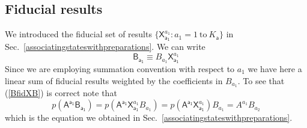 \documentclass[10pt]{article}
\begin{document}
\subsection{Fiducial results}

We introduced the  fiducial set of results $\{ \mathsf{X}_\mathsf{a_1}^{a_1} : a_1=1 ~\text{to}~ K_\mathsf{a}\}$ in Sec.\ \ref{associatingstateswithpreparations}. We can write
\begin{equation}\label{BfidXB}
\mathsf{B}_\mathsf{a_1}\equiv B_{a_1} \mathsf{X}_\mathsf{a_1}^{a_1}
\end{equation}
Since we are employing summation convention with respect to $a_1$ we have here a linear sum of fiducial results weighted by the coefficients in $B_{a_1}$.
To see that (\ref{BfidXB}) is correct note that
\begin{equation}\label{pABAB}
p(\mathsf{A^{a_1}B_{a_1}}) = p(\mathsf{A^{a_1}}\mathsf{X}_\mathsf{a_1}^{a_1} B_{a_1}) = p(\mathsf{A^{a_1}}\mathsf{X}_\mathsf{a_1}^{a_1}) B_{a_1}
= A^{a_1}B_{a_2}
\end{equation}
which is the equation we obtained in Sec.\ \ref{associatingstateswithpreparations}.
\end{document}
